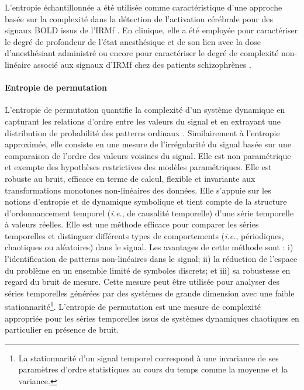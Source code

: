 L'entropie échantillonnée a été utilisée comme caractéristique d'une approche basée sur la complexité dans la détection de l'activation cérébrale pour des signaux BOLD issus de l'IRMf \citep{zhang2016exploiting}. 
En clinique, elle a été employée pour caractériser le degré de profondeur de l'état anesthésique \citep{liang2015eeg} et de son lien avec la dose d'anesthésiant administré \citep{ferenets2007behavior} ou encore pour caractériser le degré de complexité non-linéaire associé aux signaux d'IRMf chez des patients schizophrènes \citep{sokunbi2014nonlinear}. 

\paragraph{Entropie de permutation\\}
\label{peen}

L'entropie de permutation quantifie la complexité d'un système dynamique en capturant les relations d'ordre entre les valeurs du signal et en extrayant une distribution de probabilité des patterns ordinaux \citep{bandt2002permutation}. 
Similairement à l'entropie approximée, elle consiste en une mesure de l'irrégularité du signal basée sur une comparaison de l'ordre des valeurs voisines du signal. 
Elle est non paramétrique et exempte des hypothèses restrictives des modèles paramétriques. 
Elle est robuste au bruit, efficace en terme de calcul, flexible et invariante aux transformations monotones non-linéaires des données. 
Elle s'appuie sur les notions d'entropie et de dynamique symbolique et tient compte de la structure d'ordonnancement temporel (\textit{i.e.}, de causalité temporelle) d'une série temporelle à valeurs réelles. 
Elle est une méthode efficace pour comparer les séries temporelles et distinguer différents types de comportements (\textit{i.e.}, périodiques, chaotiques ou aléatoires) dans le signal. 
Les avantages de cette méthode sont : i) l'identification de patterns non-linéaires dans le signal; ii) la réduction de l'espace du problème en un ensemble limité de symboles discrets; et iii) sa robustesse en regard du bruit de mesure. 
Cette mesure peut être utilisée pour analyser des séries temporelles générées par des systèmes de grande dimension avec une faible stationnarité\footnote{La stationnarité d'un signal temporel correspond à une invariance de ses paramètres d'ordre statistiques au cours du temps comme la moyenne et la variance.}. 
L'entropie de permutation est une mesure de complexité appropriée pour les séries temporelles issus de systèmes dynamiques chaotiques en particulier en présence de bruit. 

